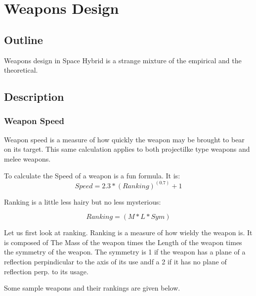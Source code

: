

\chapter{Weapons Design}
\section{Outline}
Weapons design in Space Hybrid is a strange mixture of the empirical 
and the theoretical. 
\section{Description}

\subsection{Weapon Speed}

Weapon speed is a measure of how quickly the weapon may be brought 
to bear on its target. This same calculation applies to both 
projectilke type weapons and melee weapons.

To calculate the Speed of a weapon is a fun formula. It is:
\[Speed = 2.3*(Ranking)^{(0.7)}+1\]

Ranking is a little less hairy but no less mysterious:

\[Ranking = (M*L*Sym)\]

Let us first look at ranking. Ranking is a measure of how wieldy the 
weapon is. It is composed of The Mass of the weapon times the Length 
of the weapon times the symmetry of the weapon. The symmetry is 1 if 
the weapon has a plane of a reflection perpindicular to the axis of 
its use andf a 2 if it has no plane of reflection perp. to its usage.

Some sample weapons and their rankings are given below.

